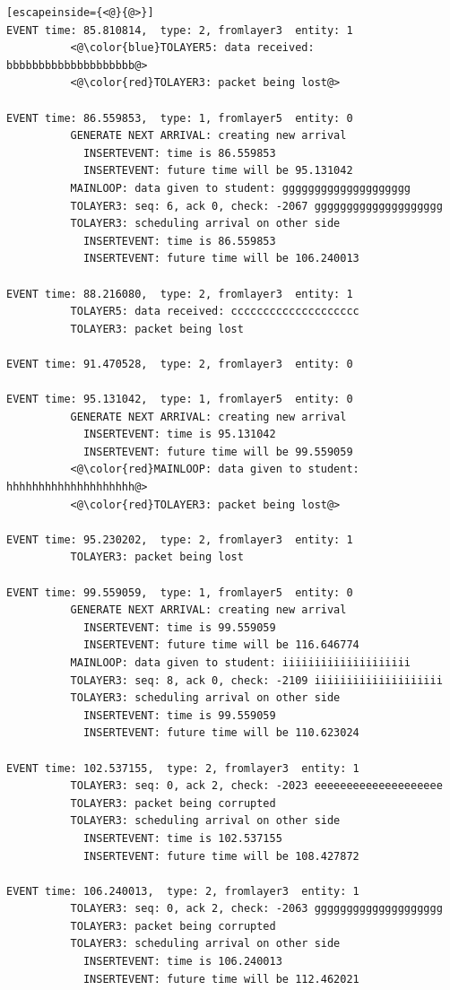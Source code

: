 \documentclass[paper=a4, fontsize=11pt]{scrartcl}
\numberwithin{equation}{section}		%
\numberwithin{figure}{section}			%
\numberwithin{table}{section}				%
\begin{document}
\begin{lstlisting}[escapeinside={<@}{@>}]
EVENT time: 85.810814,  type: 2, fromlayer3  entity: 1
          <@\color{blue}TOLAYER5: data received: bbbbbbbbbbbbbbbbbbbb@>
          <@\color{red}TOLAYER3: packet being lost@>

EVENT time: 86.559853,  type: 1, fromlayer5  entity: 0
          GENERATE NEXT ARRIVAL: creating new arrival
            INSERTEVENT: time is 86.559853
            INSERTEVENT: future time will be 95.131042
          MAINLOOP: data given to student: gggggggggggggggggggg
          TOLAYER3: seq: 6, ack 0, check: -2067 gggggggggggggggggggg
          TOLAYER3: scheduling arrival on other side
            INSERTEVENT: time is 86.559853
            INSERTEVENT: future time will be 106.240013

EVENT time: 88.216080,  type: 2, fromlayer3  entity: 1
          TOLAYER5: data received: cccccccccccccccccccc
          TOLAYER3: packet being lost

EVENT time: 91.470528,  type: 2, fromlayer3  entity: 0

EVENT time: 95.131042,  type: 1, fromlayer5  entity: 0
          GENERATE NEXT ARRIVAL: creating new arrival
            INSERTEVENT: time is 95.131042
            INSERTEVENT: future time will be 99.559059
          <@\color{red}MAINLOOP: data given to student: hhhhhhhhhhhhhhhhhhhh@>
          <@\color{red}TOLAYER3: packet being lost@>

EVENT time: 95.230202,  type: 2, fromlayer3  entity: 1
          TOLAYER3: packet being lost

EVENT time: 99.559059,  type: 1, fromlayer5  entity: 0
          GENERATE NEXT ARRIVAL: creating new arrival
            INSERTEVENT: time is 99.559059
            INSERTEVENT: future time will be 116.646774
          MAINLOOP: data given to student: iiiiiiiiiiiiiiiiiiii
          TOLAYER3: seq: 8, ack 0, check: -2109 iiiiiiiiiiiiiiiiiiii
          TOLAYER3: scheduling arrival on other side
            INSERTEVENT: time is 99.559059
            INSERTEVENT: future time will be 110.623024

EVENT time: 102.537155,  type: 2, fromlayer3  entity: 1
          TOLAYER3: seq: 0, ack 2, check: -2023 eeeeeeeeeeeeeeeeeeee
          TOLAYER3: packet being corrupted
          TOLAYER3: scheduling arrival on other side
            INSERTEVENT: time is 102.537155
            INSERTEVENT: future time will be 108.427872

EVENT time: 106.240013,  type: 2, fromlayer3  entity: 1
          TOLAYER3: seq: 0, ack 2, check: -2063 gggggggggggggggggggg
          TOLAYER3: packet being corrupted
          TOLAYER3: scheduling arrival on other side
            INSERTEVENT: time is 106.240013
            INSERTEVENT: future time will be 112.462021


\end{lstlisting}
\end{document}
